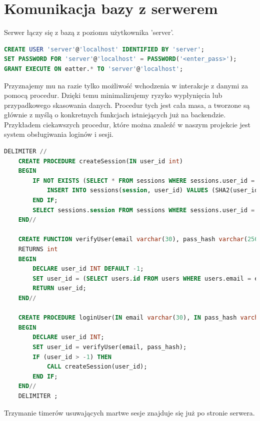 \documentclass{report}
\begin{document}
\section*{Komunikacja bazy z serwerem}
Serwer łączy się z bazą z poziomu użytkownika 'server'.
\begin{lstlisting}[language=SQL]
CREATE USER 'server'@'localhost' IDENTIFIED BY 'server';
SET PASSWORD FOR 'server'@'localhost' = PASSWORD('<enter_pass>');
GRANT EXECUTE ON eatter.* TO 'server'@'localhost';
\end{lstlisting}
Przyznajemy mu na razie tylko możliwość wchodzenia w interakcje z danymi
za pomocą procedur. Dzięki temu minimalizujemy ryzyko wypłynięcia lub
przypadkowego skasowania danych. Procedur tych jest cała masa, a tworzone
są głównie z myślą o konkretnych funkcjach istniejących już na backendzie.
Przykładem ciekawszych procedur, które można znaleźć w naszym projekcie
jest system obsługiwania loginów i sesji.
\\
\begin{lstlisting}[language=SQL]
    DELIMITER //
    CREATE PROCEDURE createSession(IN user_id int)
    BEGIN
        IF NOT EXISTS (SELECT * FROM sessions WHERE sessions.user_id = user_id) THEN
            INSERT INTO sessions(session, user_id) VALUES (SHA2(user_id, 256), user_id);
        END IF;
        SELECT sessions.session FROM sessions WHERE sessions.user_id = user_id;
    END//

    CREATE FUNCTION verifyUser(email varchar(30), pass_hash varchar(256))
    RETURNS int
    BEGIN
        DECLARE user_id INT DEFAULT -1;
        SET user_id = (SELECT users.id FROM users WHERE users.email = email AND users.pass_hash = pass_hash);
        RETURN user_id;
    END//

    CREATE PROCEDURE loginUser(IN email varchar(30), IN pass_hash varchar(256))
    BEGIN
        DECLARE user_id INT;
        SET user_id = verifyUser(email, pass_hash);
        IF (user_id > -1) THEN
            CALL createSession(user_id);
        END IF;
    END//
    DELIMITER ;
\end{lstlisting}
Trzymanie timerów usuwających martwe sesje znajduje się już po stronie
serwera.
\end{document}
